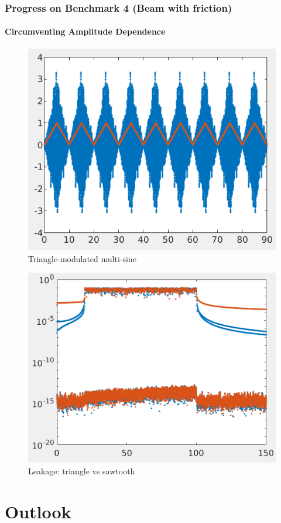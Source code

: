 \documentclass[aspectratio=169]{beamer}
\begin{document}
\begin{frame}[allowframebreaks]
  \frametitle{Progress on Benchmark 4 (Beam with friction)}
  \framesubtitle{Circumventing Amplitude Dependence}
  \vspace{-0.8cm}
  \begin{figure}
    \includegraphics[width=0.5\linewidth]{FIGS/triangle_mod}
    \caption{Triangle-modulated multi-sine}
  \end{figure}
  
  \begin{figure}
    \includegraphics[width=0.5\linewidth]{FIGS/leakage_comp}
    \caption{Leakage: triangle vs sawtooth}
  \end{figure}%
\end{frame}

\section{Outlook}
\label{sec:outlook}
\end{document}
